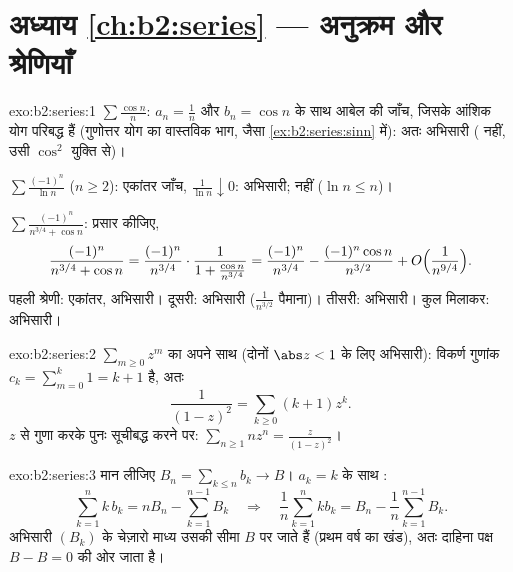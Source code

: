 \section*{अध्याय \ref{ch:b2:series} --- अनुक्रम और श्रेणियाँ}

\begin{solution}{exo:b2:series:1}
$\sum\frac{\cos n}{n}$: $a_n = \frac1n$ और $b_n =
\cos n$ के साथ आबेल की जाँच, जिसके आंशिक योग परिबद्ध हैं
(गुणोत्तर योग का वास्तविक भाग, जैसा \cref{ex:b2:series:sinn} में): अतः अभिसारी ( नहीं, उसी $\cos^2$ युक्ति से)।

$\sum \frac{(-1)^n}{\ln n}$ ($n \geq 2$): एकांतर जाँच, $\frac{1}{\ln n} \downarrow 0$: अभिसारी;  नहीं ($\ln n
\leq n$)।

$\sum \frac{(-1)^n}{n^{3/4} + \cos n}$: प्रसार कीजिए,
\[
\frac{(-1)^n}{n^{3/4} + \cos n}
= \frac{(-1)^n}{n^{3/4}}\cdot
\frac{1}{1 + \frac{\cos n}{n^{3/4}}}
= \frac{(-1)^n}{n^{3/4}}
- \frac{(-1)^n\cos n}{n^{3/2}} + O\Bigl(\frac{1}{n^{9/4}}\Bigr).
\]
पहली श्रेणी: एकांतर, अभिसारी। दूसरी:  अभिसारी ($\frac{1}{n^{3/2}}$
पैमाना)। तीसरी:  अभिसारी। कुल मिलाकर: अभिसारी।
\end{solution}

\begin{solution}{exo:b2:series:2}
$\sum_{m\geq0} z^m$ का अपने साथ  (दोनों $\abs z < 1$ के लिए  अभिसारी):
विकर्ण गुणांक $c_k =
\sum_{m=0}^{k} 1 = k + 1$ है, अतः
\[
\frac{1}{(1-z)^2} = \sum_{k\geq0} (k+1)z^k .
\]
$z$ से गुणा करके पुनः सूचीबद्ध करने पर: $\sum_{n \geq 1} n z^n =
\frac{z}{(1-z)^2}$।
\end{solution}

\begin{solution}{exo:b2:series:3}
मान लीजिए $B_n = \sum_{k \leq n} b_k \to B$। $a_k = k$ के साथ :
\[
\sum_{k=1}^{n} k\,b_k = n B_n - \sum_{k=1}^{n-1} B_k
\quad\Longrightarrow\quad
\frac1n \sum_{k=1}^{n} k b_k = B_n - \frac{1}{n}\sum_{k=1}^{n-1}
B_k .
\]
अभिसारी $(B_k)$ के चेज़ारो माध्य उसकी सीमा $B$ पर जाते हैं (प्रथम वर्ष का
खंड), अतः दाहिना पक्ष $B - B = 0$ की ओर जाता है।
\end{solution}

